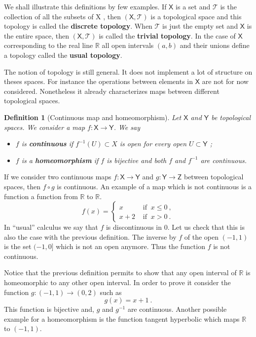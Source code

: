 \documentclass[11pt]{book}
\newcommand{\Tcal}{\mathcal{T}}
\newcommand{\Rbb}{\mathbb{R}}
\newcommand{\Xsf}{\mathsf{X}}
\newcommand{\Ysf}{\mathsf{Y}}
\newcommand{\Zsf}{\mathsf{Z}}
\theoremstyle{break}
\newtheorem{definition}{Definition}[chapter]
\begin{document}
We shall illustrate this definitions by few examples. If $\Xsf$ is a set and $\Tcal$ is the collection of all the subsets of X , then $(\Xsf,\Tcal)$ is a topological space and this topology is called the \textbf{discrete topology}. When $\Tcal$ is just the empty set and $\Xsf$ is the entire space, then $(\Xsf,\Tcal)$ is called the \textbf{trivial topology}. In the case of $\Xsf$ corresponding to the real line $\Rbb$ all open intervals $(a,b)$ and their unions define a topology called the \textbf{usual topology}. 


\bigskip


The notion of topology is still general. It does not implement a lot of structure on theses spaces. For instance the operations between elements in $\Xsf$ are not for now considered. Nonetheless it already characterizes maps between different topological spaces.


\begin{definition}[Continuous map and homeomorphism]
%
Let $\Xsf$ and $\Ysf$ be topological spaces. We consider a map $f : \Xsf \to \Ysf$. We say
%
\begin{itemize}
\item $f$ is \textbf{continuous} if $f^{-1}(U) \subset X$ is open for every open $U \subset\Ysf$ ;
\item $f$ is a \textbf{homeomorphism} if $f$ is bijective and both $f$ and $f^{-1}$ are continuous.
\end{itemize}
%
\end{definition}


If we consider two continuous maps $f : \Xsf \to \Ysf$ and $g : \Ysf \to \Zsf$ between topological spaces, then $f \circ g$ is continuous. An example of a map which is not continuous is a function a function from $\Rbb$ to $\Rbb$.
%
\begin{equation*}
f(x) = \left\{
\begin{array}{ll}
x & \mbox{ if } \ x \leq 0 \ , \\
x + 2 & \mbox{ if } \ x > 0 \ .
\end{array}
\right.
\end{equation*}
%
In ``usual'' calculus we say that $f$ is discontinuous in $0$. Let us check that this is also the case with the previous definition. The inverse by $f$ of the open $(-1,1)$ is the set $(-1,0]$ which is not an open anymore. Thus the function $f$ is not continuous.


Notice that the previous definition permits to show that any open interval of $\Rbb$ is homeomorphic to any other open interval. In order to prove it consider the function $g : (-1,1) \to (0,2)$ such as
%
\begin{equation*}
g(x) = x + 1 \ . 
\end{equation*}
%
This function is bijective and, $g$ and $g^{-1}$ are continuous. Another possible example for a homeomorphism is the function tangent hyperbolic which maps $\Rbb$ to $(-1,1)$.
\end{document}
